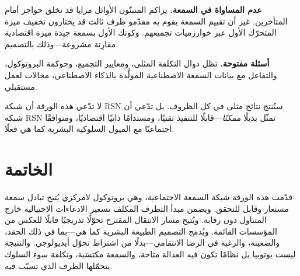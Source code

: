\documentclass[11pt,a4paper,twocolumn]{article}
\begin{document}
\textbf{عدم المساواة في السمعة.} يراكم المتبنّون الأوائل مزايا قد تخلق حواجز أمام المتأخرين. غير أن تقييم السمعة يقوم به مقدّمو طرف ثالث قد يختارون تخفيف ميزة المتحرّك الأول عبر خوارزميات تجميعهم. وكونك الأول بسمعة جيدة ميزة اقتصادية مقارِنة مشروعة---وذلك بالتصميم.

\textbf{أسئلة مفتوحة.} تظل دوال التكلفة المثلى، ومعايير التجميع، وحوكمة البروتوكول، والتفاعل مع بيانات السمعة الاصطناعية المولَّدة بالذكاء الاصطناعي، مجالات لعمل مستقبلي.

لا تدّعي هذه الورقة أن شبكة RSN ستُنتج نتائج مثلى في كل الظروف. بل تدّعي أن شبكة RSN تمثّل بديلًا \emph{ممكنًا}---قابلًا للتنفيذ تقنيًا، ومستدامًا ذاتيًا اقتصاديًا، ومتوافقًا اجتماعيًا مع الميول السلوكية البشرية كما هي فعلًا.

\section{الخاتمة}

قدّمت هذه الورقة شبكة السمعة الاجتماعية، وهي بروتوكول لامركزي يُتيح تبادل سمعة مستعار وقابل للتحقق. ويضمن مبدأ التطرف المكلف تسعير الادعاءات الاحتيالية خارج المتناول دون رقابة. ويُتيح مسار الانتقال المقترح تحوّلًا تدريجيًا قابلًا للعكس من المؤسسات القائمة. ويُدمج التصميم الطبيعة البشرية كما هي---بما في ذلك الحقد، والضغينة، والرغبة في الرضا الانتقامي---بدلًا من اشتراط تحوّل أيديولوجي. والنتيجة ليست يوتوبيا بل نظامًا تكون فيه العدالة متاحة، والسمعة مكتسَبة، وتكلفة سوء السلوك يتحمّلها الطرف الذي تسبّب فيه.


\end{document}
